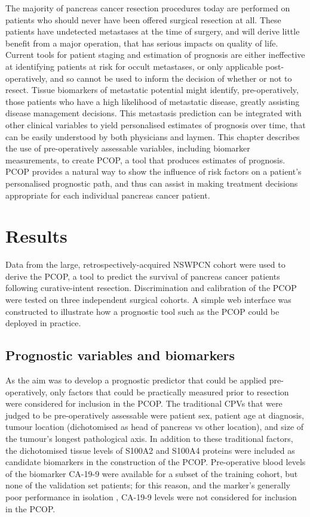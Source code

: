 \documentclass[dissertation.tex]{subfiles}
\begin{document}
The majority of pancreas cancer resection procedures today are performed on patients who should never have been offered surgical resection at all.  These patients have undetected metastases at the time of surgery, and will derive little benefit from a major operation, that has serious impacts on quality of life.  Current tools for patient staging and estimation of prognosis are either ineffective at identifying patients at risk for occult metastases, or only applicable post-operatively, and so cannot be used to inform the decision of whether or not to resect.  Tissue biomarkers of metastatic potential might identify, pre-operatively, those patients who have a high likelihood of metastatic disease, greatly assisting disease management decisions.  This metastasis prediction can be integrated with other clinical variables to yield personalised estimates of prognosis over time, that can be easily understood by both physicians and laymen.  This chapter describes the use of pre-operatively assessable variables, including biomarker measurements, to create \gls{PCOP}, a tool that produces estimates of prognosis.  \Gls{PCOP} provides a natural way to show the influence of risk factors on a patient's personalised prognostic path, and thus can assist in making treatment decisions appropriate for each individual pancreas cancer patient.


\section{Results}
Data from the large, retrospectively-acquired \gls{NSWPCN} cohort were used to derive the \gls{PCOP}, a tool to predict the survival of pancreas cancer patients following curative-intent resection.  Discrimination and calibration of the \gls{PCOP} were tested on three independent surgical cohorts.  A simple web interface was constructed to illustrate how a prognostic tool such as the \gls{PCOP} could be deployed in practice.

\subsection{Prognostic variables and biomarkers}
As the aim was to develop a prognostic predictor that could be applied pre-operatively, only factors that could be practically measured prior to resection were considered for inclusion in the \gls{PCOP}.  The traditional \glspl{CPV} that were judged to be pre-operatively assessable were patient sex, patient age at diagnosis, tumour location (dichotomised as head of pancreas vs other location), and size of the tumour's longest pathological axis.  In addition to these traditional factors, the dichotomised tissue levels of S100A2 and S100A4 proteins were included as candidate biomarkers in the construction of the \gls{PCOP}.  Pre-operative blood levels of the biomarker \gls{CA-19-9} were available for a subset of the training cohort, but none of the validation set patients; for this reason, and the marker's generally poor performance in isolation \cite{Kim2011}, \gls{CA-19-9} levels were not considered for inclusion in the \gls{PCOP}.
\end{document}
